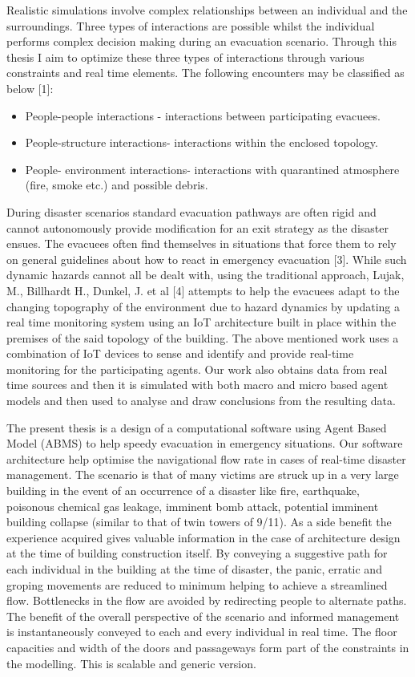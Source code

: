 Realistic simulations involve complex relationships between an individual and the surroundings. Three types of interactions are possible whilst the individual performs complex decision making during an evacuation scenario. Through this thesis I aim to optimize these three types of interactions through various constraints and real time elements. The following encounters may be classified as below [1]:

\begin{itemize}
  \item People-people interactions -  interactions between participating evacuees.
  \item People-structure interactions- interactions within the enclosed topology.
  \item People- environment interactions- interactions with quarantined atmosphere (fire, smoke etc.) and possible debris. 
\end{itemize}

During disaster scenarios standard evacuation pathways are often rigid and cannot autonomously provide modification for an exit strategy as the disaster ensues. The evacuees often find themselves in situations that force them to rely on general guidelines about how to react in emergency evacuation [3].  While such dynamic hazards cannot all be dealt with, using the traditional approach, Lujak, M., Billhardt H., Dunkel, J. et al [4] attempts to help the evacuees adapt to the changing topography of the environment due to hazard dynamics by updating a real time monitoring system using an IoT architecture built in place within the premises of the said topology of the building. The above mentioned work uses a combination of IoT devices to sense and identify and provide real-time monitoring for the participating agents. Our work also obtains data from real time sources and then it is simulated with both macro and micro based agent models and then used to analyse and draw conclusions from the resulting data.

The present thesis is a design of a computational software using Agent Based Model (ABMS) to help speedy evacuation in emergency situations. Our software architecture help optimise the navigational flow rate in cases of real-time disaster management. The scenario is that of many victims are struck up in a very large building in the event of an occurrence of a disaster like fire, earthquake, poisonous chemical gas leakage, imminent bomb attack, potential imminent building collapse (similar to that of twin towers of 9/11). As a side benefit the experience acquired gives valuable information in the case of architecture design at the time of building construction itself. By conveying a suggestive path for each individual in the building at the time of disaster, the panic, erratic and groping movements are reduced to minimum helping to achieve a streamlined flow. Bottlenecks in the flow are avoided by redirecting people to alternate paths. The benefit of the overall perspective of the scenario and informed management is instantaneously conveyed to each and every individual in real time. The floor capacities and width of the doors and passageways form part of the constraints in the modelling. This is scalable and generic version.

